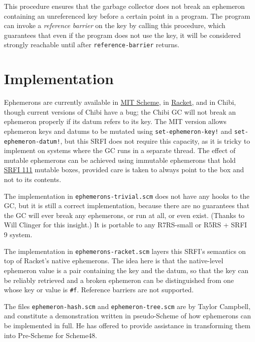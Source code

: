 This procedure ensures that the garbage collector does not break an
ephemeron containing an unreferenced key before a certain point in a
program. The program can invoke a \emph{reference barrier} on the key by
calling this procedure, which guarantees that even if the program does
not use the key, it will be considered strongly reachable until after
\texttt{reference-barrier} returns.

\section{Implementation}\label{implementation}

Ephemerons are currently available in
\href{http://www.gnu.org/software/mit-scheme/documentation/mit-scheme-ref/Ephemerons.html}{MIT
Scheme}, in
\href{http://docs.racket-lang.org/reference/ephemerons.html}{Racket},
and in Chibi, though current versions of Chibi have a bug; the Chibi GC
will not break an ephemeron properly if its datum refers to its key. The
MIT version allows ephemeron keys and datums to be mutated using
\texttt{set-ephemeron-key!} and \texttt{set-ephemeron-datum!}, but this
SRFI does not require this capacity, as it is tricky to implement on
systems where the GC runs in a separate thread. The effect of mutable
ephemerons can be achieved using immutable ephemerons that hold
\href{http://srfi.schemers.org/srfi-111/srfi-111.html}{SRFI 111} mutable
boxes, provided care is taken to always point to the box and not to its
contents.

The implementation in \texttt{ephemerons-trivial.scm} does not have any
hooks to the GC, but it is still a correct implementation, because there
are no guarantees that the GC will ever break any ephemerons, or run at
all, or even exist. (Thanks to Will Clinger for this insight.) It is
portable to any R7RS-small or R5RS + SRFI 9 system.

The implementation in \texttt{ephemerons-racket.scm} layers this SRFI's
semantics on top of Racket's native ephemerons. The idea here is that
the native-level ephemeron value is a pair containing the key and the
datum, so that the key can be reliably retrieved and a broken ephemeron
can be distinguished from one whose key or value is \texttt{\#f}.
Reference barriers are not supported.

The files \texttt{ephemeron-hash.scm} and \texttt{ephemeron-tree.scm}
are by Taylor Campbell, and constitute a demonstration written in
pseudo-Scheme of how ephemerons can be implemented in full. He has
offered to provide assistance in transforming them into Pre-Scheme for
Scheme48.

